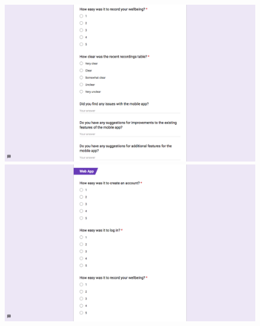 \documentclass[11pt,openright,a4paper]{report}
\begin{document}
\begin{appendices}
\begin{figure}[ht]
  \centering
  \includegraphics[width=\textwidth]{i/testingquestionnaire2.png}
  \includegraphics[width=\textwidth]{i/testingquestionnaire3.png}
\end{figure}


\end{appendices}
\end{document}
